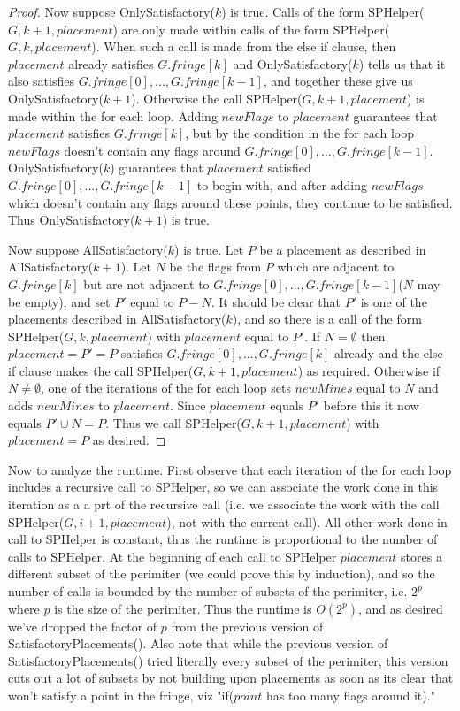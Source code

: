 \documentclass{article}
\theoremstyle{definition}
\theoremstyle{definition}
\theoremstyle{theorem}
\begin{document}
\begin{proof}
		Now suppose OnlySatisfactory($k$) is true. Calls of the form SPHelper($G,k+1,placement$) are only made within calls of the form SPHelper($G,k,placement$). When such a call is made from the else if clause, then $placement$ already satisfies $G.fringe[k]$ and OnlySatisfactory($k$) tells us that it also satisfies $G.fringe[0], ..., G.fringe[k-1]$, and together these give us OnlySatisfactory($k+1$). Otherwise the call SPHelper($G,k+1,placement$) is made within the for each loop. Adding $newFlags$ to $placement$ guarantees that $placement$ satisfies $G.fringe[k]$, but by the condition in the for each loop $newFlags$ doesn't contain any flags around $G.fringe[0], ..., G.fringe[k-1]$. OnlySatisfactory($k$) guarantees that $placement$ satisfied $G.fringe[0], ..., G.fringe[k-1]$ to begin with, and after adding $newFlags$ which doesn't contain any flags around these points, they continue to be satisfied. Thus OnlySatisfactory($k + 1$) is true.
		
		Now suppose AllSatisfactory($k$) is true. Let $P$ be a placement as described in AllSatisfactory($k+1$).  Let $N$ be the flags from $P$ which are adjacent to $G.fringe[k]$ but are not adjacent to $G.fringe[0], ..., G.fringe[k-1]$($N$ may be empty), and set $P'$ equal to $P - N$. It should be clear that $P'$ is one of the placements described in AllSatisfactory($k$), and so there is a call of the form SPHelper($G,k,placement$)  with $placement$ equal to $P'$. If $N = \emptyset$ then $placement = P' = P$ satisfies $G.fringe[0], ..., G.fringe[k]$ already and the else if clause makes the call SPHelper($G,k + 1,placement$) as required. Otherwise if $N \neq \emptyset$, one of the iterations of the for each loop sets $newMines$ equal to $N$ and adds $newMines$ to $placement$. Since $placement$ equals $P'$ before this it now equals $P' \cup N = P$. Thus we call SPHelper($G,k + 1,placement$) with $placement = P$ as desired.
	\end{proof}

	
	Now to analyze the runtime. First observe that each iteration of the for each loop includes a recursive call to SPHelper, so we can associate the work done in this iteration as a a prt of the recursive call (i.e. we associate the work with the call SPHelper($G, i+1, placement$), not with the current call). All other work done in call to SPHelper is constant, thus the runtime is proportional to the number of calls to SPHelper. At the beginning of each call to SPHelper $placement$ stores a different subset of the perimiter (we could prove this by induction), and so the number of calls is bounded by the number of subsets of the perimiter, i.e. $2^p$ where $p$ is the size of the perimiter. Thus the runtime is $O(2^p)$, and as desired we've dropped the factor of $p$ from the previous version of SatisfactoryPlacements(). Also note that while the previous version of SatisfactoryPlacements() tried literally every subset of the perimiter, this version cuts out a lot of subsets by not building upon placements as soon as its clear that won't satisfy a point in the fringe, viz "if($point$ has too many flags around it)."
	
	
	
	
	
	
\end{document}
